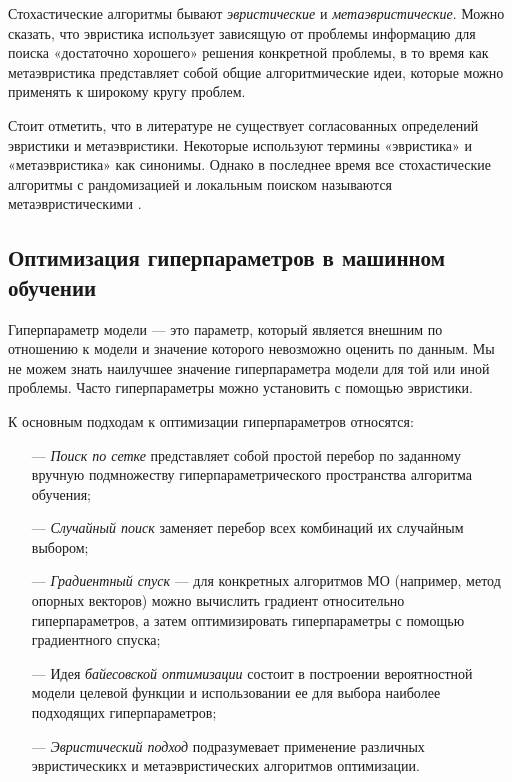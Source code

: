 Стохастические алгоритмы бывают \emph{эвристические} и \emph{метаэвристические}.
Можно сказать, что эвристика использует зависящую от проблемы информацию
для поиска «достаточно хорошего» решения конкретной проблемы, в
то время как метаэвристика представляет собой общие алгоритмические
идеи, которые можно применять к широкому кругу проблем.

Стоит отметить, что в литературе не существует согласованных определений
эвристики и метаэвристики. Некоторые используют термины «эвристика» и
«метаэвристика» как синонимы. Однако в последнее время все стохастические
алгоритмы с рандомизацией и локальным поиском называются
метаэвристическими \cite{Yang2009}.

\subsection{Оптимизация гиперпараметров в машинном обучении}\label{optimization}

Гиперпараметр модели — это параметр, который является внешним по
отношению к модели и значение которого невозможно оценить по данным.
Мы не можем знать наилучшее значение гиперпараметра модели для той или иной проблемы.
Часто гиперпараметры можно установить с помощью эвристики.

К основным подходам к оптимизации гиперпараметров относятся:

\begin{itemize}
    \item[—] \emph{Поиск по сетке} представляет собой простой перебор
        по заданному вручную подмножеству гиперпараметрического пространства
        алгоритма обучения;
    \item[—] \emph{Случайный поиск} заменяет перебор всех комбинаций их случайным выбором;
    \item[—] \emph{Градиентный спуск} — для конкретных алгоритмов МО (например, метод опорных векторов)
        можно вычислить градиент относительно гиперпараметров, а затем
        оптимизировать гиперпараметры с помощью градиентного спуска;
    \item[—] Идея \emph{байесовской оптимизации} состоит в построении
        вероятностной модели целевой функции и использовании ее для выбора
        наиболее подходящих гиперпараметров;
    \item[—] \emph{Эвристический подход} подразумевает применение различных эвристическикх и
        метаэвристических алгоритмов оптимизации.
\end{itemize}

